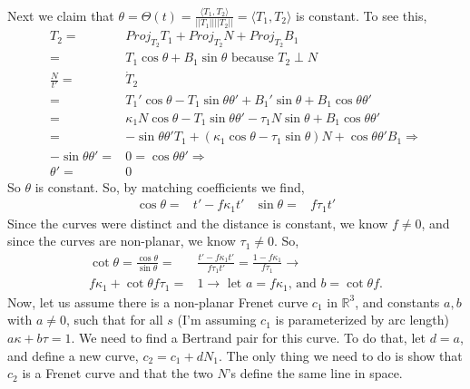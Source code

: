 \documentclass[12pt]{amsart}
\begin{document}
\\Next we claim that $\theta=\Theta(t)=\frac{\langle T_1,T_2\rangle}{||T_1||||T_2||}=\langle T_1,T_2\rangle$ is constant. To see this,
\begin{align*}
	T_2=&Proj_{T_2}T_1+Proj_{T_2}N+Proj_{T_2}B_1
	\\=&T_1\cos\theta+B_1\sin\theta \text{ because $T_2\perp N$}
	\\\frac{N}{t'}=&\dot T_2
	\\=&T_1'\cos\theta-T_1\sin\theta\theta'+B_1'\sin\theta+B_1\cos\theta\theta'
	\\=&\kappa_1N\cos\theta-T_1\sin\theta\theta'-\tau_1N\sin\theta+B_1\cos\theta\theta'
	\\=&-\sin\theta\theta'T_1+(\kappa_1\cos\theta-\tau_1\sin\theta)N+\cos\theta\theta'B_1\Rightarrow
	\\-\sin\theta\theta'=&0=\cos\theta\theta'\Rightarrow
	\\\theta'=&0
\end{align*}
So $\theta$ is constant. So, by matching coefficients we find,
\begin{align*}
	\cos\theta=&t'-f\kappa_1t' & \sin\theta=&f\tau_1t'
\end{align*}
Since the curves were distinct and the distance is constant, we know $f\neq0$, and since the curves are non-planar, we know $\tau_1\neq0$. So,
\begin{align*}
	\cot\theta=\frac{\cos\theta}{\sin\theta}=&\frac{t'-f\kappa_1t'}{f\tau_1t'}=\frac{1-f\kappa_1}{f\tau_1}\rightarrow
	\\f\kappa_1+\cot\theta f\tau_1=&1\rightarrow \text{ let }a=f\kappa_1 \text{, and }b=\cot\theta f.
\end{align*}
Now, let us assume there is a non-planar Frenet curve $c_1$ in $\mathbb{R}^3$, and constants $a,b$ with $a\neq0$, such that for all $s$ (I'm assuming $c_1$ is parameterized by arc length) $a\kappa+b\tau=1$. We need to find a Bertrand pair for this curve. To do that, let $d=a$, and define a new curve, $c_2=c_1+dN_1$. The only thing we need to do is show that $c_2$ is a Frenet curve and that the two $N$'s define the same line in space.


\newpage
\end{document}
